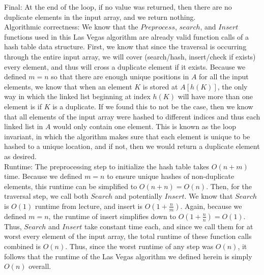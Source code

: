 \documentclass[11pt]{article}
\begin{document}
\begin{enumerate}
    Final: At the end of the loop, if no value was returned, then there are no duplicate elements in the input array, and we return nothing. \\
    
    Algorithmic correctness: We know that the $Preprocess$,  $search$, and $Insert$ functions used in this Las Vegas algorithm are already valid function calls of a hash table data structure. First, we know that since the traversal is occurring through the entire input array, we will cover (search/hash, insert/check if exists) every element, and thus will cross a duplicate element if it exists. Because we defined $m =n$ so that there are enough unique positions in $A$ for all the input elements, we know that when an element $K$ is stored at $A[h(K)]$, the only way in which the linked list beginning at index $h(K)$ will have more than one element is if $K$ is a duplicate. If we found this to not be the case, then we know that all elements of the input array were hashed to different indices and thus each linked list in $A$ would only contain one element. This is known as the loop invariant, in which the algorithm makes sure that each element is unique to be hashed to a unique location, and if not, then we would return a duplicate element as desired. \\
    
    Runtime: The preprocessing step to initialize the hash table takes $O(n+m)$ time. Because we defined $m=n$ to ensure unique hashes of non-duplicate elements, this runtime can be simplified to $O(n+n) = O(n)$. Then, for the traversal step, we call both $Search$ and potentially $Insert$. We know that $Search$ is $O(1)$ runtime from lecture, and insert is $O(1 + \frac{n}{m})$. Again, because we defined $m=n$, the runtime of insert simplifies down to $O(1 + \frac{n}{n}) = O(1)$. Thus, $Search$ and $Insert$ take constant time each, and since we call them for at worst every element of the input array, the total runtime of these function calls combined is $O(n)$. Thus, since the worst runtime of any step was $O(n)$, it follows that the runtime of the Las Vegas algorithm we defined herein is simply $O(n)$ overall. 
    
    


\end{enumerate}
\end{document}
